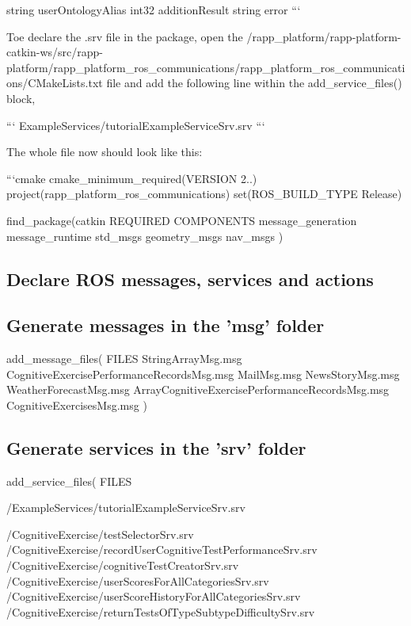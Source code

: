 string user\-Ontology\-Alias int32 addition\-Result string error ```

Toe declare the .srv file in the package, open the {\ttfamily /rapp\-\_\-platform/rapp-\/platform-\/catkin-\/ws/src/rapp-\/platform/rapp\-\_\-platform\-\_\-ros\-\_\-communications/rapp\-\_\-platform\-\_\-ros\-\_\-communications/\-C\-Make\-Lists.txt} file and add the following line within the {\ttfamily add\-\_\-service\-\_\-files()} block,

``` Example\-Services/tutorial\-Example\-Service\-Srv.\-srv ```

The whole file now should look like this\-:

```cmake cmake\-\_\-minimum\-\_\-required(V\-E\-R\-S\-I\-O\-N 2..) project(rapp\-\_\-platform\-\_\-ros\-\_\-communications) set(\-R\-O\-S\-\_\-\-B\-U\-I\-L\-D\-\_\-\-T\-Y\-P\-E Release)

find\-\_\-package(catkin R\-E\-Q\-U\-I\-R\-E\-D C\-O\-M\-P\-O\-N\-E\-N\-T\-S message\-\_\-generation message\-\_\-runtime std\-\_\-msgs geometry\-\_\-msgs nav\-\_\-msgs )

\subparagraph*{}

\subsection*{Declare R\-O\-S messages, services and actions}

\subparagraph*{}

\subsection*{Generate messages in the 'msg' folder}

add\-\_\-message\-\_\-files( F\-I\-L\-E\-S String\-Array\-Msg.\-msg Cognitive\-Exercise\-Performance\-Records\-Msg.\-msg Mail\-Msg.\-msg News\-Story\-Msg.\-msg Weather\-Forecast\-Msg.\-msg Array\-Cognitive\-Exercise\-Performance\-Records\-Msg.\-msg Cognitive\-Exercises\-Msg.\-msg )

\subsection*{Generate services in the 'srv' folder}

add\-\_\-service\-\_\-files( F\-I\-L\-E\-S

/\-Example\-Services/tutorial\-Example\-Service\-Srv.srv

/\-Cognitive\-Exercise/test\-Selector\-Srv.srv /\-Cognitive\-Exercise/record\-User\-Cognitive\-Test\-Performance\-Srv.srv /\-Cognitive\-Exercise/cognitive\-Test\-Creator\-Srv.srv /\-Cognitive\-Exercise/user\-Scores\-For\-All\-Categories\-Srv.srv /\-Cognitive\-Exercise/user\-Score\-History\-For\-All\-Categories\-Srv.srv /\-Cognitive\-Exercise/return\-Tests\-Of\-Type\-Subtype\-Difficulty\-Srv.srv

